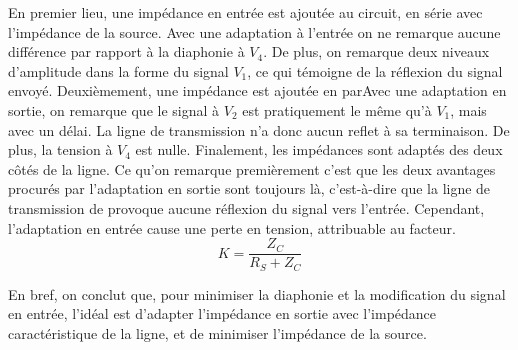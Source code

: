 En premier lieu, une impédance en entrée est ajoutée au circuit, en série avec l'impédance de la source. Avec une adaptation à l'entrée  on ne remarque aucune différence par rapport à la diaphonie à $V_4$. De plus, on remarque deux niveaux d'amplitude dans la forme du signal $V_1$, ce qui témoigne de la réflexion du signal envoyé.
Deuxièmement, une impédance est ajoutée en parAvec une adaptation en sortie, on remarque que le signal à $V_2$ est pratiquement le même qu'à $V_1$, mais avec un délai. La ligne de transmission n'a donc aucun reflet à sa terminaison. De plus, la tension à $V_4$ est nulle.
Finalement, les impédances sont adaptés des deux côtés de la ligne. Ce qu'on remarque premièrement c'est que les deux avantages procurés par l'adaptation en sortie sont toujours là, c'est-à-dire que la ligne de transmission de provoque aucune réflexion du signal vers l'entrée. Cependant, l'adaptation en entrée cause une perte en tension, attribuable au facteur.
\[K = \frac{Z_C}{R_S+Z_C}\]

En bref, on conclut que, pour minimiser la diaphonie et la modification du signal en entrée, l'idéal est d'adapter l'impédance en sortie avec l'impédance caractéristique de la ligne, et de minimiser l'impédance de la source.
